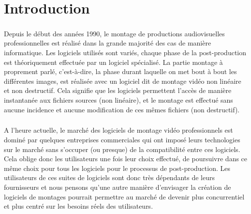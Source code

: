 








\setcounter{page}{1} \newpage \chapter*{Introduction}

\paragraph{}

Depuis le début des années 1990, le montage de
productions audiovisuelles professionnelles est réalisé dans la grande
majorité des cas de manière informatique. Les logiciels utilisés
sont variés, chaque phase de la post-production est théoriquement
effectuée par un logiciel spécialisé. La partie montage à proprement
parlé, c'est-à-dire, la phase durant laquelle on met bout à bout
les différentes images, est réalisée avec un logiciel dit de montage
vidéo non linéaire et non destructif. Cela signifie que les logiciels
permettent l'accès de manière instantanée aux
fichiers sources (non linéaire), et le montage est effectué sans aucune
incidence et aucune modification de ces mêmes fichiers (non destructif).

\paragraph{}

A l'heure actuelle, le marché des logiciels de montage vidéo
professionnels est dominé par quelques entreprises commerciales qui ont
imposé leurs technologies sur le marché sans s'occuper (ou presque)
de la compatibilité entre ces logiciels.  Cela oblige donc
les utilisateurs une fois leur choix effectué, de poursuivre
dans ce même choix pour tous les logiciels
pour le processus de post-production. Les utilisateurs de ces suites
de logiciels sont donc très dépendants de leurs fournisseurs et nous
pensons qu'une autre manière d'envisager la création de logiciels de
montages pourrait permettre au marché de devenir plus concurrentiel et
plus centré sur les besoins réels des utilisateurs.

